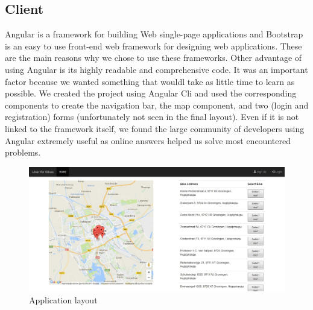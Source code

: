 \subsection{Client}
Angular is a framework for building Web single-page applications and Bootstrap is an easy to use front-end web framework for designing web applications. These are the main reasons why we chose to use these frameworks. Other advantage of using Angular is its highly readable and comprehensive code. It was an important factor because we wanted something that wouldl take as little time to learn as possible. We created the project using Angular Cli and used the corresponding components to create the navigation bar, the map component, and two (login and registration) forms (unfortunately not seen in the final layout). Even if it is not linked to the framework itself, we found the large community of developers using Angular extremely useful as online answers helped us solve most encountered problems.

\begin{figure}[H]
		\centering
		\includegraphics[width=\textwidth]{images/screenshot.png}
		\caption{Application layout}
		\label{front-end}
	\end{figure}
